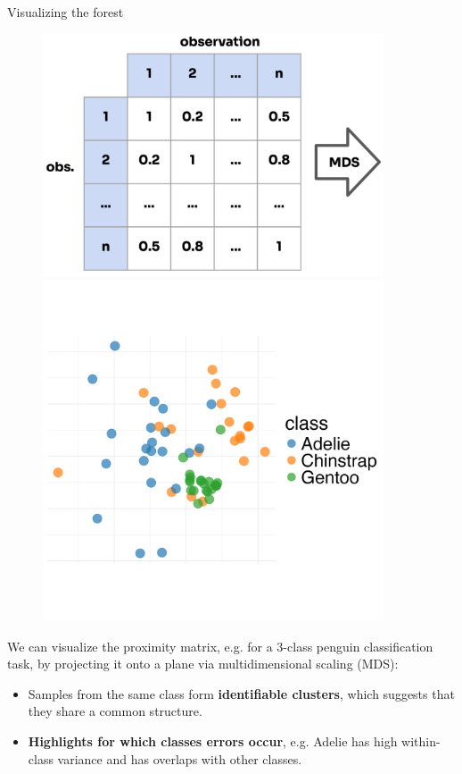 \documentclass[11pt,compress,t,notes=noshow, xcolor=table]{beamer}
\begin{document}
\begin{vbframe}{Visualizing the forest}

\vspace{-5ex}
\begin{figure}
\centering
\begin{minipage}{.5\textwidth}
  \centering
  \includegraphics[width=0.9\textwidth]{figure_man/forest-prox-matrix.png}
\end{minipage}%
\begin{minipage}{.5\textwidth}
  \centering
  \includegraphics[width=0.9\textwidth]{figure/forest-prox-vis_1.png}
\end{minipage}
\end{figure}
\vspace{-3ex}
We can visualize the proximity matrix, e.g. for a 3-class penguin classification task, by projecting it onto a plane via multidimensional scaling (MDS):
\begin{itemize}
  \item Samples from the same class form \textbf{identifiable clusters}, which suggests that they share a common structure.
  \item \textbf{Highlights for which classes errors occur}, e.g. Adelie has high within-class variance and has overlaps with other classes.
\end{itemize}


\end{vbframe}
\end{document}
